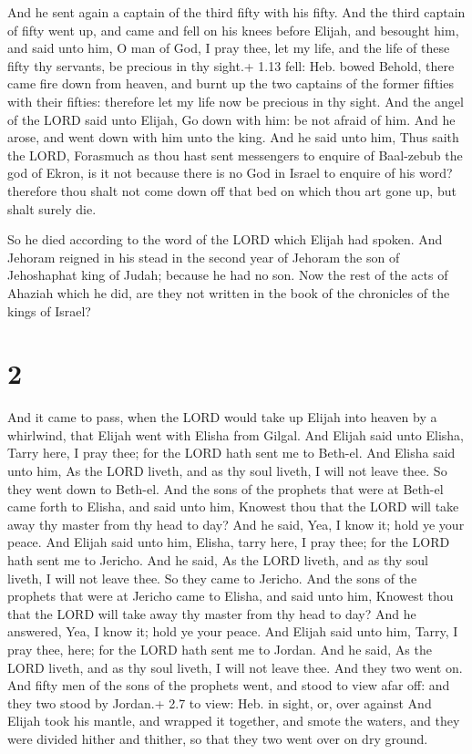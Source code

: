  And he sent again a captain of the third fifty with his
fifty. And the third captain of fifty went up, and came and fell on his
knees before Elijah, and besought him, and said unto him, O man of God,
I pray thee, let my life, and the life of these fifty thy servants, be
precious in thy sight.+ 1.13 fell: Heb. bowed  Behold,
there came fire down from heaven, and burnt up the two captains of the
former fifties with their fifties: therefore let my life now be precious
in thy sight.  And the angel of the LORD said unto Elijah,
Go down with him: be not afraid of him. And he arose, and went down with
him unto the king.  And he said unto him, Thus saith the
LORD, Forasmuch as thou hast sent messengers to enquire of Baal-zebub
the god of Ekron, is it not because there is no God in Israel to enquire
of his word? therefore thou shalt not come down off that bed on which
thou art gone up, but shalt surely die.

 So he died according to the word of the LORD which
Elijah had spoken. And Jehoram reigned in his stead in the second year
of Jehoram the son of Jehoshaphat king of Judah; because he had no son.
 Now the rest of the acts of Ahaziah which he did, are they
not written in the book of the chronicles of the kings of Israel?

\hypertarget{section-1}{%
\section{2}\label{section-1}}

 And it came to pass, when the LORD would take up Elijah
into heaven by a whirlwind, that Elijah went with Elisha from Gilgal.
 And Elijah said unto Elisha, Tarry here, I pray thee; for
the LORD hath sent me to Beth-el. And Elisha said unto him, As the LORD
liveth, and as thy soul liveth, I will not leave thee. So they went down
to Beth-el.  And the sons of the prophets that were at
Beth-el came forth to Elisha, and said unto him, Knowest thou that the
LORD will take away thy master from thy head to day? And he said, Yea, I
know it; hold ye your peace.  And Elijah said unto him,
Elisha, tarry here, I pray thee; for the LORD hath sent me to Jericho.
And he said, As the LORD liveth, and as thy soul liveth, I will not
leave thee. So they came to Jericho.  And the sons of the
prophets that were at Jericho came to Elisha, and said unto him, Knowest
thou that the LORD will take away thy master from thy head to day? And
he answered, Yea, I know it; hold ye your peace.  And Elijah
said unto him, Tarry, I pray thee, here; for the LORD hath sent me to
Jordan. And he said, As the LORD liveth, and as thy soul liveth, I will
not leave thee. And they two went on.  And fifty men of the
sons of the prophets went, and stood to view afar off: and they two
stood by Jordan.+ 2.7 to view: Heb. in sight, or, over against
 And Elijah took his mantle, and wrapped it together, and
smote the waters, and they were divided hither and thither, so that they
two went over on dry ground.

